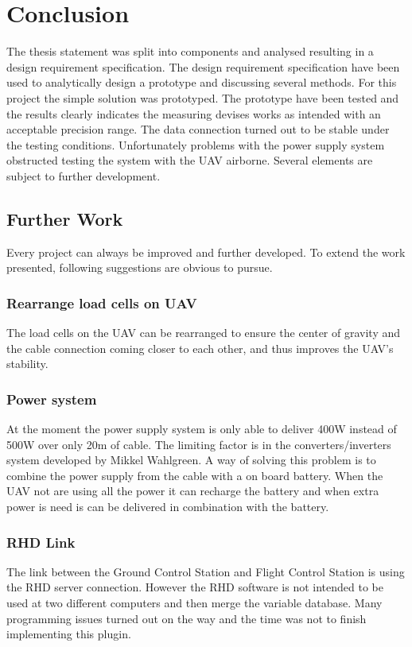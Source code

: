 \chapter{Conclusion}
The thesis statement was split into components and analysed resulting in a design requirement specification. The design requirement specification have been used to analytically design a prototype and discussing several methods. For this project the simple solution was prototyped. The prototype have been tested and the results clearly indicates the measuring devises works as intended with an acceptable precision range. The data connection turned out to be stable under the testing conditions. Unfortunately problems with the power supply system obstructed testing the system with the UAV airborne.
Several elements are subject to further development.


\section{Further Work}
Every project can always be improved and further developed. To extend the work presented, following suggestions are obvious to pursue.

\subsection*{Rearrange load cells on UAV}
The load cells on the UAV can be rearranged to ensure the center of gravity and the cable connection coming closer to each other, and thus improves the UAV's stability.


\subsection*{Power system}
At the moment the power supply system is only able to deliver 400W instead of 500W over only 20m of cable. The limiting factor is in the converters/inverters system developed by Mikkel Wahlgreen. A way of solving this problem is to combine the power supply from the cable with a on board battery. When the UAV not are using all the power it can recharge the battery and when extra power is need is can be delivered in combination with the battery.

\subsection{RHD Link}
The link between the Ground Control Station and Flight Control Station is using the RHD server connection. However the RHD software is not intended to be used at two different computers and then merge the variable database. Many programming issues turned out on the way and the time was not to finish implementing this plugin.  

